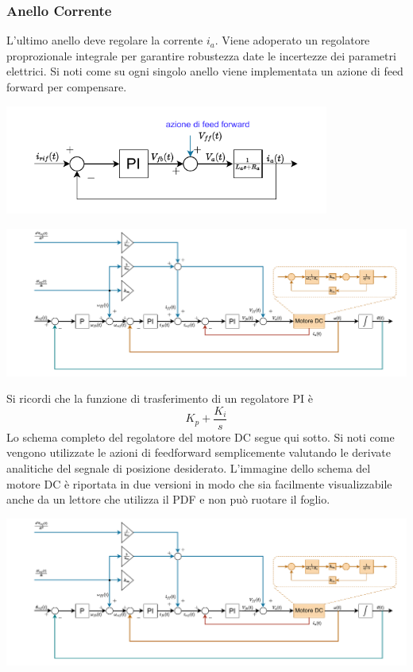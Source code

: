 \documentclass[10pt, letterpaper]{report}
\begin{document}
\subsubsection{Anello Corrente}
L'ultimo anello deve regolare la corrente $i_a$. Viene adoperato un regolatore proprozionale integrale per garantire robustezza date le incertezze dei parametri elettrici. Si noti come su ogni singolo anello viene implementata un azione di feed forward per compensare.\begin{center}
    \includegraphics[width=0.8\textwidth ]{images/anelloCorrente.pdf}
\end{center}\newpage
\begin{center}
    \includegraphics[width=1.5\textwidth,angle=90,origin=c ]{images/controlloMotoreDc.pdf}
\end{center}\newpage
Si ricordi che la funzione di trasferimento di un regolatore PI è $$ K_p+\frac{K_i}{s}$$
Lo schema completo del regolatore del motore DC segue qui sotto. Si noti come vengono utilizzate le azioni di feedforward semplicemente valutando le derivate analitiche del segnale di posizione desiderato. L'immagine dello schema del motore DC è riportata in due versioni in modo che sia facilmente visualizzabile anche da un lettore che utilizza il PDF e non può ruotare il foglio.
\begin{center}
    \includegraphics[width=1\textwidth]{images/controlloMotoreDc.pdf}
\end{center}\flowerLine 
\end{document}
